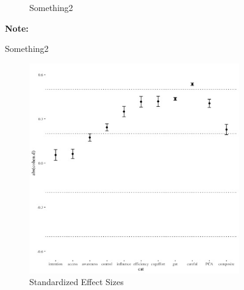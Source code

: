 \documentclass[12pt,letterpaper]{article}
\begin{document}
\begin{figure}[ht]
\begin{subfigure}{.5\textwidth}
        \caption{Something2}
        \label{fig:pymk_rankingboost}
    \end{subfigure}
\footnotesize \textbf{Note:} 
\end{figure}


\begin{figure}
\caption{Deliberateness}
  \begin{subfigure}{.5\textwidth} 
        \centering
        \includegraphics[width=1\linewidth]{Output/Graphs/Experiments/Automaticity/standardized effect sizes.jpg} 
        \caption{Standardized Effect Sizes}
        \label{fig:auto_effsize}
    \end{subfigure}
    \begin{subfigure}{.5\textwidth} 
        \centering

\end{subfigure}
\end{figure}
\end{document}
